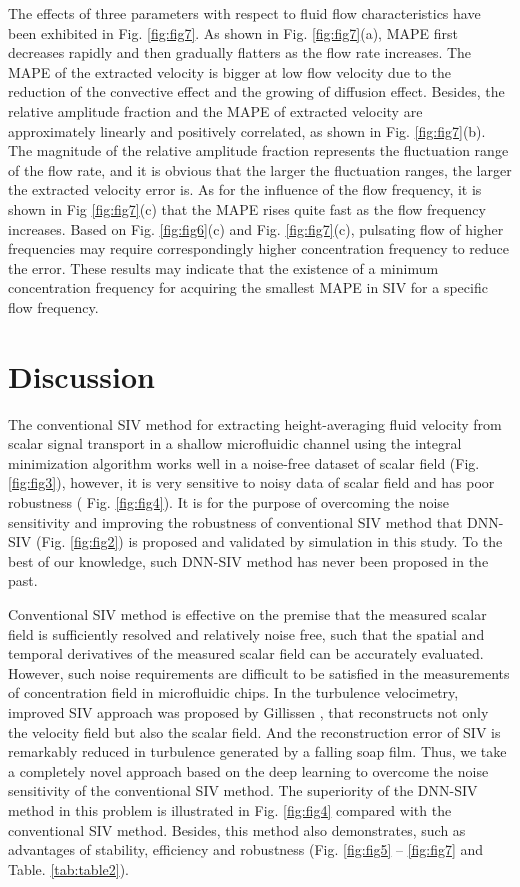 \documentclass{article}
\begin{document}
The effects of three parameters with respect to fluid flow characteristics have been exhibited in Fig. \ref{fig:fig7}. As shown in Fig. \ref{fig:fig7}(a), MAPE first decreases rapidly and then gradually flatters as the flow rate increases. The MAPE of the extracted velocity is bigger at low flow velocity due to the reduction of the convective effect and the growing of diffusion effect. Besides, the relative amplitude fraction and the MAPE of extracted velocity are approximately linearly and positively correlated, as shown in Fig. \ref{fig:fig7}(b). The magnitude of the relative amplitude fraction represents the fluctuation range of the flow rate, and it is obvious that the larger the fluctuation ranges, the larger the extracted velocity error is. As for the influence of the flow frequency, it is shown in Fig \ref{fig:fig7}(c) that the MAPE rises quite fast as the flow frequency increases. Based on Fig. \ref{fig:fig6}(c) and Fig. \ref{fig:fig7}(c), pulsating flow of higher frequencies may require correspondingly higher concentration frequency to reduce the error. These results may indicate that the existence of a minimum concentration frequency for acquiring the smallest MAPE in SIV for a specific flow frequency.

\section{Discussion}
The conventional SIV method for extracting height-averaging fluid velocity from scalar signal transport in a shallow microfluidic channel using the integral minimization algorithm works well in a noise-free dataset of scalar field (Fig. \ref{fig:fig3}), however, it is very sensitive to noisy data of scalar field and has poor robustness ( Fig. \ref{fig:fig4}). It is for the purpose of overcoming the noise sensitivity and improving the robustness of conventional SIV method that DNN-SIV (Fig. \ref{fig:fig2}) is proposed and validated by simulation in this study. To the best of our knowledge, such DNN-SIV method has never been proposed in the past.\par

Conventional SIV method is effective on the premise that the measured scalar field is sufficiently resolved and relatively noise free, such that the spatial and temporal derivatives of the measured scalar field can be accurately evaluated. However, such noise requirements are difficult to be satisfied in the measurements of concentration field in microfluidic chips. In the turbulence velocimetry, improved SIV approach was proposed by Gillissen \citep{gillissen2018space}, that reconstructs not only the velocity field but also the scalar field. And the reconstruction error of SIV is remarkably reduced in turbulence generated by a falling soap film. Thus, we take a completely novel approach based on the deep learning to overcome the noise sensitivity of the conventional SIV method. The superiority of the DNN-SIV method in this problem is illustrated in Fig. \ref{fig:fig4} compared with the conventional SIV method. Besides, this method also demonstrates, such as advantages of stability, efficiency and robustness (Fig. \ref{fig:fig5} -- \ref{fig:fig7} and Table. \ref{tab:table2}).\par
\end{document}

